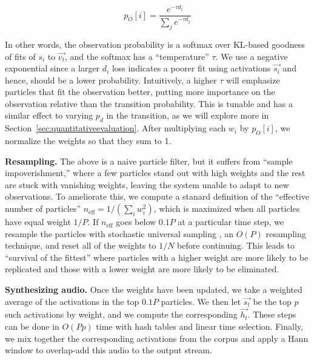 \documentclass{article}
\begin{document}
\begin{equation}
    \label{eq:observationprob}
    p_O[i] = \frac{e^{-\tau d_i}}{ \sum_{j} e^{-\tau d_j}}
\end{equation}

In other words, the observation probability is a softmax over KL-based goodness of fits of $s_i$ to $\vec{v_t}$, and the softmax has a ``temperature'' $\tau$.  We use a negative exponential since a larger $d_i$ loss indicates a poorer fit using activations $\vec{s_i}$ and hence, should be a lower probability.  Intuitively, a higher $\tau$ will emphasize particles that fit the observation better, putting more importance on the observation relative than the transition probability.  This is tunable and has a similar effect to varying $p_d$ in the transition, as we will explore more in Section~\ref{sec:quantitativeevaluation}.  After multiplying each $w_i$ by $p_O[i]$, we normalize the weights so that they sum to 1.  

\textbf{Resampling.} The above is a naive particle filter, but it suffers from ``sample impoverishment,'' where a few particles stand out with high weights and the rest are stuck with vanishing weights, leaving the system unable to adapt to new observations.  To ameliorate this, we compute a stanard definition of the ``effective number of particles'' $n_{\text{eff}} = 1/(\sum_{i} w_i^2)$, which is maximized when all particles have equal weight $1/P$.  If $n_{\text{eff}}$ goes below $0.1P$ at a particular time step, we resample the particles with stochastic universal sampling \cite{kitagawa1996monte, carpenter1999improved}, an $O(P)$ resampling technique, and reset all of the weights to $1/N$ before continuing.  This leads to ``survival of the fittest'' where particles with a higher weight are more likely to be replicated and those with a lower weight are more likely to be eliminated.

\textbf{Synthesizing audio.} Once the weights have been updated, we take a weighted average of the activations in the top $0.1P$ particles.  We then let $\vec{s_t}$ be the top $p$ such activations by weight, and we compute the corresponding $\vec{h_t}$. These steps can be done in $O(Pp)$ time with hash tables and linear time selection.  Finally, we mix together the corresponding activations from the corpus and apply a Hann window to overlap-add this audio to the output stream.
\end{document}
